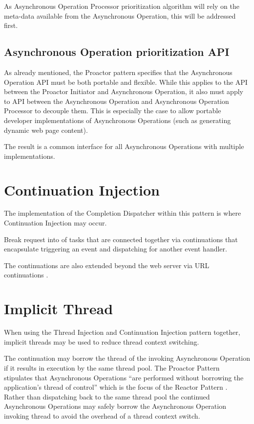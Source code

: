 \documentclass{article}
\begin{document}
As Asynchronous Operation Processor prioritization algorithm will rely on the
meta-data available from the Asynchronous Operation, this will be addressed first.

\subsection{Asynchronous Operation prioritization API}

As already mentioned, the Proactor pattern specifies that the Asynchronous
Operation API must be both portable and flexible.  While this applies to the API
between the Proactor Initiator and Asynchronous Operation, it also must apply to
API between the Asynchronous Operation and Asynchronous Operation Processor to
decouple them.  This is especially the case to allow portable developer
implementations of Asynchronous Operations (such as generating dynamic web page
content).

The result is a common interface for all Asynchronous Operations with multiple
implementations.


\section{Continuation Injection}

The implementation of the Completion Dispatcher within this pattern is where
Continuation Injection may occur.

Break request into \cite{pipeline} of tasks that are connected together via
continuations \cite{continuations} that encapsulate triggering an event and
dispatching for another event handler.

The continuations are also extended beyond the web server via URL continuations
\cite{url-continuation}.


\section{Implicit Thread}

When using the Thread Injection and Continuation Injection pattern together,
implicit threads may be used to reduce thread context switching.

The continuation may borrow the thread of the invoking Asynchronous Operation if
it results in execution by the same thread pool.  The Proactor Pattern
stipulates that Asynchronous Operations ``are performed without borrowing the
application's thread of control'' which is the focus of the Reactor Pattern
\cite{reactor}.  Rather than dispatching back to the same thread pool the
continued Asynchronous Operations may safely borrow the Asynchronous Operation
invoking thread to avoid the overhead of a thread context switch.
\end{document}

